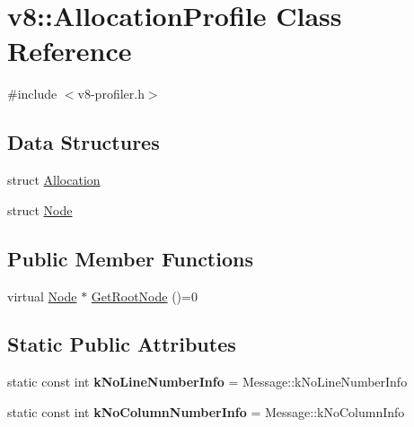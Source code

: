 \hypertarget{classv8_1_1AllocationProfile}{}\section{v8\+:\+:Allocation\+Profile Class Reference}
\label{classv8_1_1AllocationProfile}


{\ttfamily \#include $<$v8-\/profiler.\+h$>$}

\subsection*{Data Structures}
\begin{DoxyCompactItemize}
\item 
struct \hyperlink{structv8_1_1AllocationProfile_1_1Allocation}{Allocation}
\item 
struct \hyperlink{structv8_1_1AllocationProfile_1_1Node}{Node}
\end{DoxyCompactItemize}
\subsection*{Public Member Functions}
\begin{DoxyCompactItemize}
\item 
virtual \hyperlink{structv8_1_1AllocationProfile_1_1Node}{Node} $\ast$ \hyperlink{classv8_1_1AllocationProfile_afea045dae30df5477088e2f0b7edb6c4}{Get\+Root\+Node} ()=0
\end{DoxyCompactItemize}
\subsection*{Static Public Attributes}
\begin{DoxyCompactItemize}
\item 
static const int {\bfseries k\+No\+Line\+Number\+Info} = Message\+::k\+No\+Line\+Number\+Info\hypertarget{classv8_1_1AllocationProfile_a26fdfe9e4846d26c83d0ad8c2ed2d783}{}\label{classv8_1_1AllocationProfile_a26fdfe9e4846d26c83d0ad8c2ed2d783}

\item 
static const int {\bfseries k\+No\+Column\+Number\+Info} = Message\+::k\+No\+Column\+Info\hypertarget{classv8_1_1AllocationProfile_a9cfa103f73e82629694eee3734826eb7}{}\label{classv8_1_1AllocationProfile_a9cfa103f73e82629694eee3734826eb7}

\end{DoxyCompactItemize}


